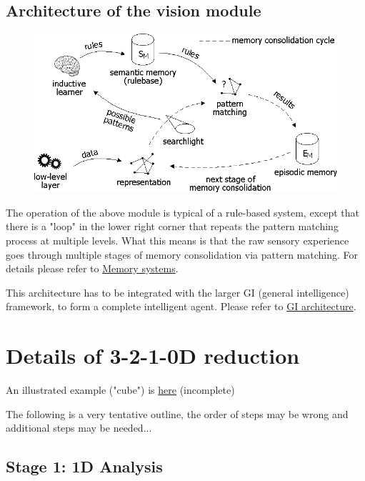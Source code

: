 \subsection{Architecture of the vision module}

\begin{figure}[H]
\centering
\includegraphics[scale=0.6, bb=0 0 726 380]{VisionArchitecture.PNG}
\end{figure}

The operation of the above module is typical of a rule-based system, except that there is a "loop" in the lower right corner that repeats the pattern matching process at multiple levels. What this means is that the raw sensory experience goes through multiple stages of memory consolidation via pattern matching. For details please refer to \href{GI-MemorySystems.htm}{Memory systems}. 

This architecture has to be integrated with the larger GI (general intelligence) framework, to form a complete intelligent agent. Please refer to \href{GI-architecture.htm}{GI architecture}.

\section{Details of  3-2-1-0D reduction}

An illustrated example ("cube") is \href{Vis-Example.htm}{here} (incomplete)
 
\underconst

The following is a very tentative outline, the order of steps may be wrong and additional steps may be needed...

\subsection{Stage 1: 1D Analysis }

